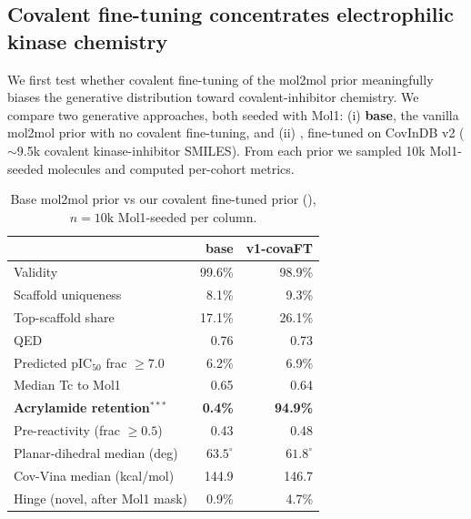 \subsection{Covalent fine-tuning concentrates electrophilic kinase chemistry}
\label{sec:results:covft}

We first test whether covalent fine-tuning of the mol2mol prior meaningfully biases the generative distribution toward covalent-inhibitor chemistry. We compare two generative approaches, both seeded with Mol1: (i) \textbf{base}, the vanilla mol2mol prior with no covalent fine-tuning, and (ii) \textbf{\Cvcovaft{}}, fine-tuned on CovInDB v2 ($\sim$9.5k covalent kinase-inhibitor SMILES). From each prior we sampled 10k Mol1-seeded molecules and computed per-cohort metrics.

\begin{table}[!ht]
\centering
\caption{Base mol2mol prior vs our covalent fine-tuned prior (\Cvcovaft{}), $n{=}10\text{k}$ Mol1-seeded per column.}
\label{tab:covft}
\small
\setlength{\tabcolsep}{6pt}
\renewcommand{\arraystretch}{1.15}
\begin{tabular}{lrr}
\toprule
                                            & \textbf{base}                   & \textbf{v1-covaFT} \\
\midrule
Validity                                    & 99.6\%                          & 98.9\%         \\
Scaffold uniqueness                         & 8.1\%                           & 9.3\%          \\
Top-scaffold share                          & 17.1\%                          & 26.1\%         \\
QED                                         & 0.76                            & 0.73           \\
Predicted pIC$_{50}$ frac $\ge 7.0$         & 6.2\%                           & 6.9\%          \\
Median Tc to Mol1                           & 0.65                            & 0.64           \\
\textbf{Acrylamide retention}$^{***}$        & \textbf{0.4\%}                  & \textbf{94.9\%} \\
Pre-reactivity (frac $\ge 0.5$)             & 0.43                            & 0.48           \\
Planar-dihedral median (deg)                & $63.5^\circ$                    & $61.8^\circ$   \\
Cov-Vina median (kcal/mol)                  & 144.9                           & 146.7          \\
\midrule
Hinge (novel, after Mol1 mask)              & 0.9\%                           & 4.7\%          \\
\bottomrule
\end{tabular}
\end{table}

